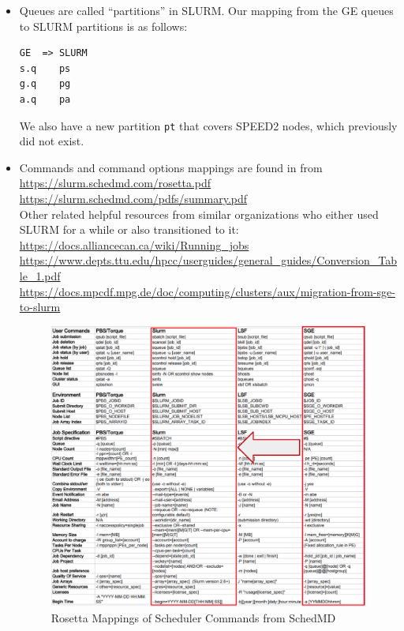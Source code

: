 \documentclass{easychair}
\begin{document}
\begin{itemize}
\item
Queues are called ``partitions'' in SLURM. Our mapping from the GE queues
to SLURM partitions is as follows:
\begin{verbatim}
GE  => SLURM
s.q    ps
g.q    pg
a.q    pa
\end{verbatim}
We also have a new partition \texttt{pt} that covers SPEED2 nodes,
which previously did not exist.

\item
Commands and command options mappings are found in  from\\
\url{https://slurm.schedmd.com/rosetta.pdf}\\
\url{https://slurm.schedmd.com/pdfs/summary.pdf}\\
Other related helpful resources from similar organizations who either used
SLURM for a while or also transitioned to it:\\
\url{https://docs.alliancecan.ca/wiki/Running_jobs}\\
\url{https://www.depts.ttu.edu/hpcc/userguides/general_guides/Conversion_Table_1.pdf}\\
\url{https://docs.mpcdf.mpg.de/doc/computing/clusters/aux/migration-from-sge-to-slurm}

\begin{figure}[htpb]
	\includegraphics[width=\columnwidth]{images/rosetta-mapping}
	\caption{Rosetta Mappings of Scheduler Commands from SchedMD}
	\label{fig:rosetta-mappings}
\end{figure}


\end{itemize}
\end{document}
